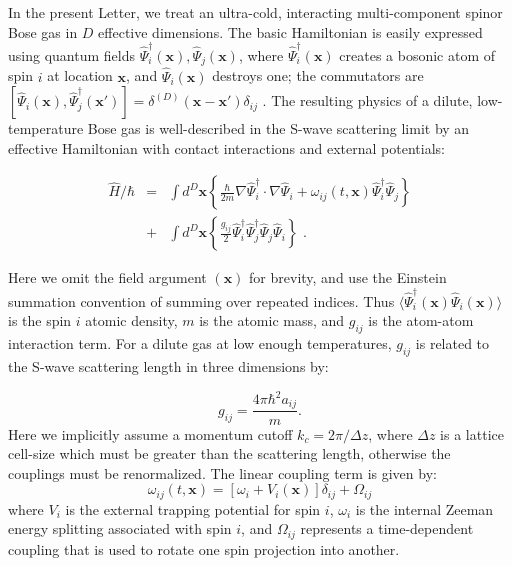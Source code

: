 \documentclass[aps,prl,twocolumn,showpacs,amsmath,amssymb,superscriptaddress]{revtex4-1}
\begin{document}
In the present Letter, we treat an ultra-cold,
interacting multi-component spinor Bose gas in $D$ effective dimensions.
The basic Hamiltonian is easily expressed using quantum fields
$\widehat{\Psi}_{i}^{\dagger}({\mathbf{x}}),\widehat{\Psi}_{j}({\mathbf{x}})$,
where $\widehat{\Psi}_{i}^{\dagger}({\mathbf{x}})$ creates a bosonic atom of spin $i$
at location $\mathbf{x}$, and $\widehat{\Psi}_{i}({\mathbf{x}})$ destroys one;
the commutators are
$[\widehat{\Psi}_{i}(\mathbf{x}),\widehat{\Psi}_{j}^{\dagger}(\mathbf{x}')]=
\delta^{(D)}(\mathbf{x}-\mathbf{x}')\delta_{ij}\,\,.$
The resulting physics of a dilute, low-temperature Bose gas
is well-described in the S-wave scattering limit by an effective Hamiltonian
with contact interactions and external potentials:

\begin{eqnarray}
	\widehat{H}/\hbar & = & \int d^{D}{\mathbf{x}} \left\{
		\frac{\hbar}{2m}{\nabla} \widehat{\Psi}_{i}^{\dagger} \cdot {\nabla} \widehat{\Psi}_{i} +
		\omega_{ij}(t,{\mathbf{x}}) \widehat{\Psi}_{i}^{\dagger} \widehat{\Psi}_{j}
	\right\} \nonumber \\
	& + & \int d^{D}{\mathbf{x}} \left\{
		\frac{g_{ij}}{2} \widehat{\Psi}_{i}^{\dagger} \widehat{\Psi}_{j}^{\dagger}
		\widehat{\Psi}_{j} \widehat{\Psi}_{i}
	\right\} \,\,.
\end{eqnarray}

Here we omit the field argument $({\mathbf{x}})$ for brevity,
and use the Einstein summation convention of summing over repeated indices.
Thus $\langle \widehat{\Psi}_{i}^{\dagger}({\mathbf{x}}) \widehat{\Psi}_{i}({\mathbf{x}}) \rangle$
is the spin $i$ atomic density, $m$ is the atomic mass,
and $g_{ij}$ is the atom-atom interaction term.
For a dilute gas at low enough temperatures,
$g_{ij}$ is related to the S-wave scattering length in three dimensions by:

\begin{equation}
	g_{ij}=\frac{4\pi\hbar^{2}a_{ij}}{m}.
\end{equation}
Here we implicitly assume a momentum cutoff $k_{c}=2\pi/\Delta z$,
where $\Delta z$ is a lattice cell-size which must be greater than the scattering length,
otherwise the couplings must be renormalized.
The linear coupling term is given by:
\begin{equation}
	\omega_{ij}(t,{\mathbf{x}}) = \left[
		\omega_{i}+V_{i} \left( \mathbf{x} \right)
	\right] \delta_{ij} + \Omega_{ij}
\end{equation}
where $V_{i}$ is the external trapping potential for spin $i$,
$\omega_{i}$ is the internal Zeeman energy splitting associated with spin $i$,
and $\Omega_{ij}$ represents a time-dependent coupling
that is used to rotate one spin projection into another.
\end{document}
